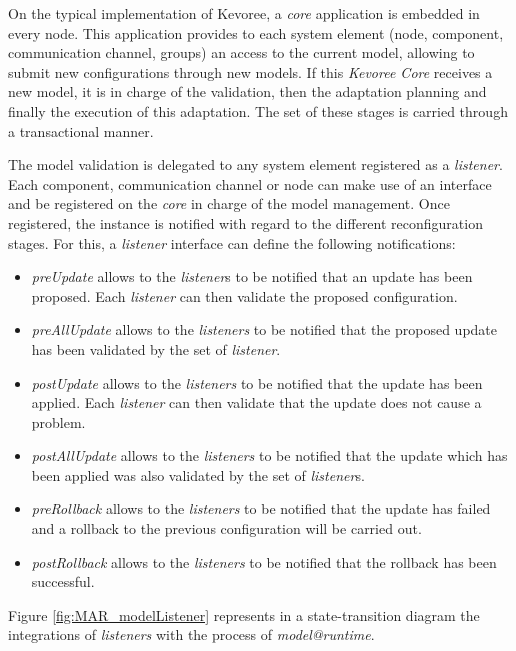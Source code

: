 On the typical implementation of Kevoree, a \textit{core} application is embedded in every node. 
This application provides to each system element (node, component, communication channel, groups) an access to the current model, allowing to submit new configurations through new models.
If this \textit{Kevoree Core} receives a new model, it is in charge of the validation, then the adaptation planning and finally the execution of this adaptation.
The set of these stages is carried through a transactional manner.

The model validation is delegated to any system element registered as a \textit{listener}.
Each component, communication channel or node can make use of an interface and be registered on the \textit{core} in charge of the model management.
Once registered, the instance is notified with regard to the different reconfiguration stages.
For this, a \textit{listener} interface can define the following notifications:
\begin{itemize}
	\item \emph{preUpdate} allows to the \emph{listener}s to be notified that an update has been proposed.
	Each \emph{listener} can then validate the proposed configuration.
	\item \emph{preAllUpdate} allows to the \emph{listeners} to be notified that the proposed update has been validated by the set of \emph{listener}.
	\item \emph{postUpdate} allows to the \emph{listeners} to be notified that the update has been applied.
	Each \emph{listener} can then validate that the update does not cause a problem.
	\item \emph{postAllUpdate} allows to the \emph{listeners} to be notified that the update which has been applied was also validated by the set of \emph{listener}s.
	\item \emph{preRollback} allows to the \emph{listeners} to be notified that the update has failed and a rollback to the previous configuration will be carried out.
	\item \emph{postRollback} allows to the \emph{listeners} to be notified that the rollback has been successful.
\end{itemize}
Figure \ref{fig:MAR_modelListener} represents in a state-transition diagram the integrations of \textit{listeners} with the process of \textit{model@runtime}.


